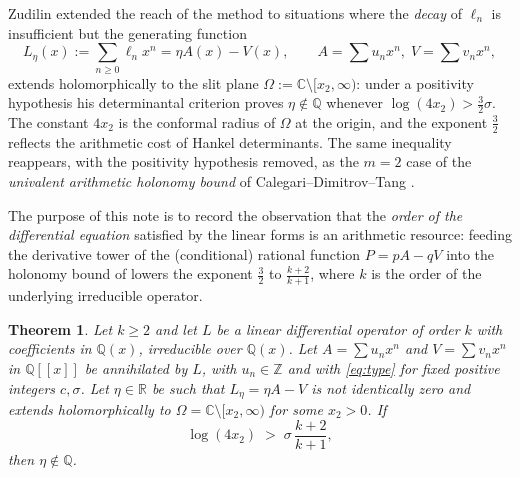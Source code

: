 \documentclass[11pt]{amsart}
\newtheorem{theorem}{Theorem}[section]
\theoremstyle{definition}
\theoremstyle{remark}
\newcommand{\Q}{\mathbb{Q}}
\newcommand{\Z}{\mathbb{Z}}
\newcommand{\R}{\mathbb{R}}
\newcommand{\C}{\mathbb{C}}
\begin{document}
Zudilin \cite{Zudilin} extended the reach of the method to situations
where the \emph{decay} of $\ell_n$ is insufficient but the generating
function
\[
L_\eta(x):=\sum_{n\ge0}\ell_n x^n=\eta A(x)-V(x),\qquad
A=\sum u_nx^n,\; V=\sum v_nx^n,
\]
extends holomorphically to the slit plane
$\Omega:=\C\setminus[x_2,\infty)$: under a positivity hypothesis his
determinantal criterion proves $\eta\notin\Q$ whenever
$\log(4x_2)>\tfrac32\sigma$. The constant $4x_2$ is the conformal radius
of $\Omega$ at the origin, and the exponent $\tfrac32$ reflects the
arithmetic cost of Hankel determinants. The same inequality reappears,
with the positivity hypothesis removed, as the $m=2$ case of the
\emph{univalent arithmetic holonomy bound} of
Calegari--Dimitrov--Tang \cite[Theorem~2.7.1 and \S2.7.7]{CDT}.

The purpose of this note is to record the observation that the
\emph{order of the differential equation} satisfied by the linear forms
is an arithmetic resource: feeding the derivative tower of the
(conditional) rational function $P=pA-qV$ into the holonomy bound of
\cite{CDT} lowers the exponent $\tfrac32$ to $\tfrac{k+2}{k+1}$, where
$k$ is the order of the underlying irreducible operator.

\begin{theorem}\label{thm:main}
Let $k\ge2$ and let $L$ be a linear differential operator of order $k$
with coefficients in $\Q(x)$, irreducible over $\Q(x)$. Let
$A=\sum u_nx^n$ and $V=\sum v_nx^n$ in $\Q[[x]]$ be annihilated by $L$,
with $u_n\in\Z$ and with \eqref{eq:type} for fixed positive integers
$c,\sigma$. Let $\eta\in\R$ be such that $L_\eta=\eta A-V$ is not
identically zero and extends holomorphically to
$\Omega=\C\setminus[x_2,\infty)$ for some $x_2>0$. If
\begin{equation}\label{eq:criterion}
\log(4x_2)\;>\;\sigma\,\frac{k+2}{k+1},
\end{equation}
then $\eta\notin\Q$.
\end{theorem}
\end{document}
